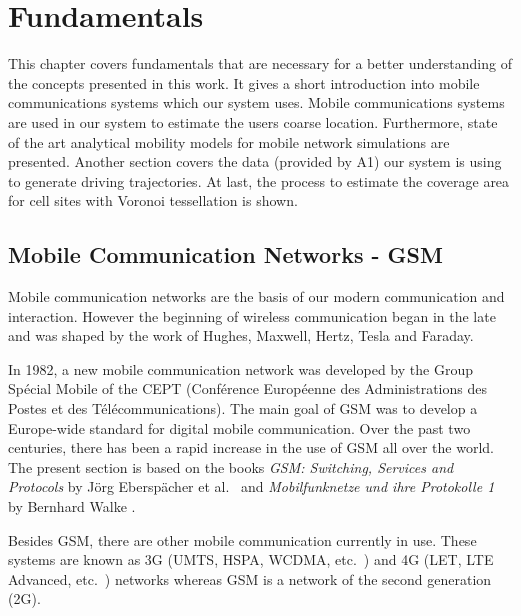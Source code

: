 \chapter{Fundamentals}
\label{cha:fundamentals}
This chapter covers fundamentals that are necessary for a better understanding of the concepts presented in this work. It gives a short introduction into mobile communications systems which our system uses. Mobile communications systems are used in our system to estimate the users coarse location. Furthermore, state of the art analytical mobility models for mobile network simulations are presented. Another section covers the data (provided by A1) our system is using to generate driving trajectories. At last, the process to estimate the coverage area for cell sites with Voronoi tessellation is shown.
\section{Mobile Communication Networks - GSM}
Mobile communication networks are the basis of our modern communication and interaction. However the beginning of wireless communication began in the late  and was shaped by the work of Hughes, Maxwell, Hertz, Tesla and Faraday. 

In 1982, a new mobile communication network was developed by the Group Spécial Mobile of the CEPT (Conférence Européenne des Administrations des Postes et des Télécommunications). The main goal of GSM was to develop a Europe-wide standard for digital mobile communication. Over the past two centuries, there has been a rapid increase in the use of GSM all over the world. The present section is based on the books \emph{GSM: Switching, Services and Protocols} by Jörg Eberspächer et al.\ \cite{Eberspaecher2001} and \emph{Mobilfunknetze und ihre Protokolle 1} by Bernhard Walke \cite{Walke2001}. 

Besides GSM, there are other mobile communication currently in use. These systems are known as 3G (UMTS, HSPA, WCDMA, etc.\ ) and 4G (LET, LTE Advanced, etc.\ ) networks whereas GSM is a network of the second generation (2G).

